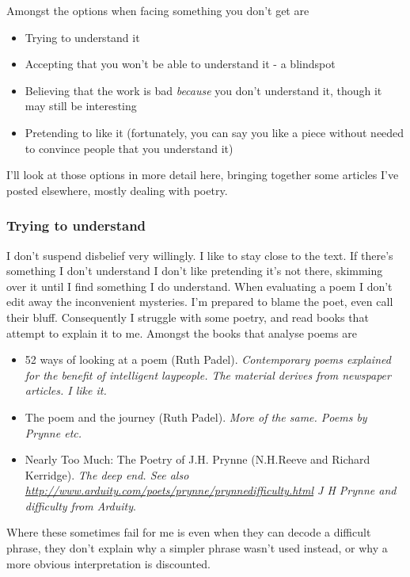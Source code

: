 \documentclass[11pt]{article}
\begin{document}
Amongst the options when facing something you don't get are
\begin{itemize}
\item Trying to understand it
\item Accepting that you won't be able to understand it - a blindspot
\item Believing that the work is bad \textit{because} you don't understand it, though it may still be interesting
\item Pretending to like it (fortunately, you can say you like a piece without needed to convince people that you understand it)
\end{itemize}

I'll look at those options in more detail here, bringing together some articles I've posted elsewhere, mostly dealing with poetry.

\subsubsection*{Trying to understand}

I don't suspend disbelief very willingly. I like to stay close to the text. If there's something I don't understand I don't like pretending it's not there, skimming over it until I find something I do understand. When evaluating a poem I don't edit away the inconvenient mysteries. I'm prepared to blame the poet, even call their bluff. Consequently I struggle with some poetry, and read books that attempt to explain it to me. Amongst the books that analyse poems are
\begin{itemize}

\item 52 ways of looking at a poem (Ruth Padel). \textit{Contemporary poems explained for the benefit of intelligent laypeople. The material derives from newspaper articles. I like it.} 

\item The poem and the journey (Ruth Padel). \textit{More of the same. Poems by Prynne etc.}
\item Nearly Too Much: The Poetry of J.H. Prynne (N.H.Reeve and Richard Kerridge). \textit{The deep end. See also \url{http://www.arduity.com/poets/prynne/prynnedifficulty.html} J H Prynne and difficulty from Arduity}.
\end{itemize}

Where these sometimes fail for me is even when they can decode a difficult phrase, they don't explain why a simpler phrase wasn't used instead, or why a more obvious interpretation is discounted.
\end{document}
